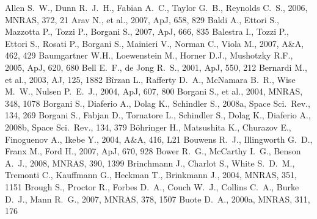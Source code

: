\documentclass[useAMS,usenatbib]{mn2e}
\begin{document}
 
\begin{thebibliography}{} 
   Allen S.~W., Dunn R.~J.~H., Fabian A.~C., Taylor G.~B., Reynolds C.~S., 
   2006, MNRAS, 372, 21 
   Arav N., et al., 2007, ApJ, 658, 829 
   Baldi A., Ettori S., Mazzotta P., Tozzi P., Borgani S., 2007, ApJ, 666, 835 
   Balestra I., Tozzi P., Ettori S., Rosati P., Borgani S., Mainieri V., 
   Norman C., Viola M., 2007, A\&A, 462, 429 
   Baumgartner W.H., Loewenstein M., Horner D.J., Mushotzky R.F., 2005, ApJ,  
   620, 680  
   Bell E.~F., de Jong R.~S., 2001, ApJ, 550, 212
   Bernardi M., et al., 2003, AJ, 125, 1882
   B{\^i}rzan L., Rafferty D.~A., McNamara B.~R., Wise M.~W., Nulsen P.~E.~J.,
   2004, ApJ, 607, 800 
   Borgani S., et al., 2004, MNRAS, 348, 1078
   Borgani S., Diaferio A., Dolag K., Schindler S., 2008a, Space Sci.\  Rev., 
   134, 269
   Borgani S., Fabjan D., Tornatore L., Schindler S., Dolag K.,  Diaferio A., 
   2008b, Space Sci.\ Rev., 134, 379 
   B{\"o}hringer H., Matsushita K., Churazov E., Finoguenov A., Ikebe Y., 2004,
   A\&A, 416, L21
   Bouwens R.~J., Illingworth G.~D., Franx M., Ford H., 2007, ApJ, 670, 928
   Bower R.~G., McCarthy I.~G., Benson A.~J., 2008, MNRAS, 390, 1399 
   Brinchmann J., Charlot S., White S.~D.~M., Tremonti C., Kauffmann G., 
   Heckman T., Brinkmann J., 2004, MNRAS, 351, 1151 
   Brough S., Proctor R., Forbes D.~A., Couch W.~J., Collins C.~A., Burke 
   D.~J., Mann R.~G., 2007, MNRAS, 378, 1507 
   Buote D.~A., 2000a, MNRAS, 311, 176 

\end{thebibliography}
\end{document}
